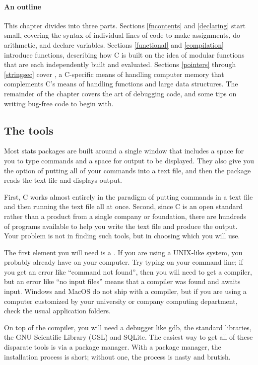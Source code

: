 \paragraph{An outline} 

This chapter divides into three parts.  Sections \ref{fncontents} and
\ref{declaring} start small, covering the syntax of individual lines
of code to make assignments, do arithmetic, and declare variables.
Sections \ref{functional} and \ref{compilation} introduce functions,
describing how C is built on the idea of modular functions that are each
independently built and evaluated.  Sections \ref{pointers} through
\ref{stringsec} cover , a C-specific means of handling
computer memory that complements C's means of handling functions and
large data structures. The remainder of the chapter covers the art of
debugging code, and some tips on writing bug-free code to begin with. 

\subsection{The tools} 
Most stats packages are built around a single window that includes a
space for you to type commands and a space for output to be displayed.
They also give you the option of putting all of your commands into a
text file, and then the package reads the text file and displays output.

First, C works almost entirely in the paradigm of putting commands in a
text file and then running the text file all at once. Second, since
C is an open standard rather than a product from a single company or
foundation, there
are hundreds of programs available to help you write the text file and
produce the output. Your problem is not in finding such tools, but in
choosing which you will use.

The first element you will need is a . If you are using
a UNIX-like system, you probably already have  on your
computer. Try typing  on your command line; if you get an
error like ``command not found'', then you will need to get a compiler,
but an error like ``no input files'' means that a compiler was found
and awaits input. Windows and MacOS do not ship with a compiler, but if you
are using a computer customized by your university or company computing
department, check the usual application folders.

On top of the compiler, you will need a debugger like gdb, the standard
libraries, the GNU Scientific Library (GSL) and SQLite.  The easiest way
to get all of these disparate tools is via a package manager. With a
package manager, the installation process is short; without one,
the process is nasty and brutish.


